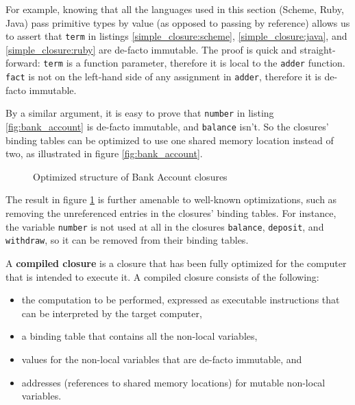 For example, knowing that all the languages used in this section (Scheme, Ruby,
Java) pass primitive types by value (as opposed to passing by reference) allows
us to assert that \texttt{term} in listings \ref{simple_closure:scheme},
\ref{simple_closure:java}, and \ref{simple_closure:ruby} are de-facto
immutable. The proof is quick and straight-forward: \texttt{term} is a
function parameter, therefore it is local to the \texttt{adder} function.
\texttt{fact} is not on the left-hand side of any assignment in \texttt{adder},
therefore it is de-facto immutable.

By a similar argument, it is easy to prove that \texttt{number} in listing
\ref{fig:bank_account} is de-facto immutable, and \texttt{balance} isn't. So
the closures' binding tables can be optimized to use one shared memory location
instead of two, as illustrated in figure \ref{fig:bank_account}.

\begin{figure}[hbtp]
	\caption{Optimized structure of Bank Account closures}
	\label{fig:bank_account:optimized}
\end{figure}

The result in figure \ref{fig:bank_account:optimized} is further amenable to well-known
optimizations, such as removing the unreferenced entries in the closures'
binding tables. For instance, the variable \texttt{number} is not used at all
in the closures \texttt{balance}, \texttt{deposit}, and \texttt{withdraw}, so
it can be removed from their binding tables.

A \textbf{compiled closure} is a closure that has been fully optimized for the
computer that is intended to execute it. A compiled closure consists of the
following:
\begin{itemize}
  \item the computation to be performed, expressed as executable instructions
  that can be interpreted by the target computer,
  \item a binding table that contains all the non-local variables,
  \item values for the non-local variables that are de-facto immutable, and
  \item addresses (references to shared memory locations) for mutable
  non-local variables.
\end{itemize}

